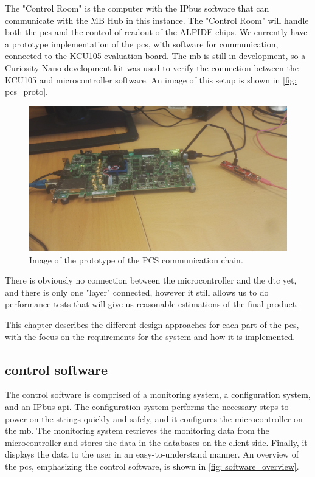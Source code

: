 \documentclass[main.tex]{subfiles}
\begin{document}
The "Control Room" is the computer with the IPbus software that can communicate with the MB Hub in this instance. The "Control Room" will handle both the \gls{pcs} and the control of readout of the ALPIDE-chips. We currently have a prototype implementation of the \gls{pcs}, with software for communication, connected to the KCU105 evaluation board. The \gls{mb} is still in development, so a Curiosity Nano development kit was used to verify the connection between the KCU105 and microcontroller software. An image of this setup is shown in \autoref{fig: pcs_proto}.

\begin{figure}[!htpb]
    \centering
    \includegraphics[width=15cm]{images/pcs_setup.jpg}
    \caption{Image of the prototype of the PCS communication chain.}
    \label{fig: pcs_proto}
\end{figure}
\FloatBarrier


There is obviously no connection between the microcontroller and the \gls{dtc} yet, and there is only one "layer" connected, however it still allows us to do performance tests that will give us reasonable estimations of the final product.

This chapter describes the different design approaches for each part of the \gls{pcs}, with the focus on the requirements for the system and how it is implemented.

\subsection{control software}

The control software is comprised of a monitoring system, a configuration system, and an IPbus \gls{api}. The configuration system performs the necessary steps to power on the strings quickly and safely, and it configures the microcontroller on the \gls{mb}. The monitoring system retrieves the monitoring data from the microcontroller and stores the data in the databases on the client side. Finally, it displays the data to the user in an easy-to-understand manner. An overview of the \gls{pcs}, emphasizing the control software, is shown in \autoref{fig: software_overview}.
\end{document}
